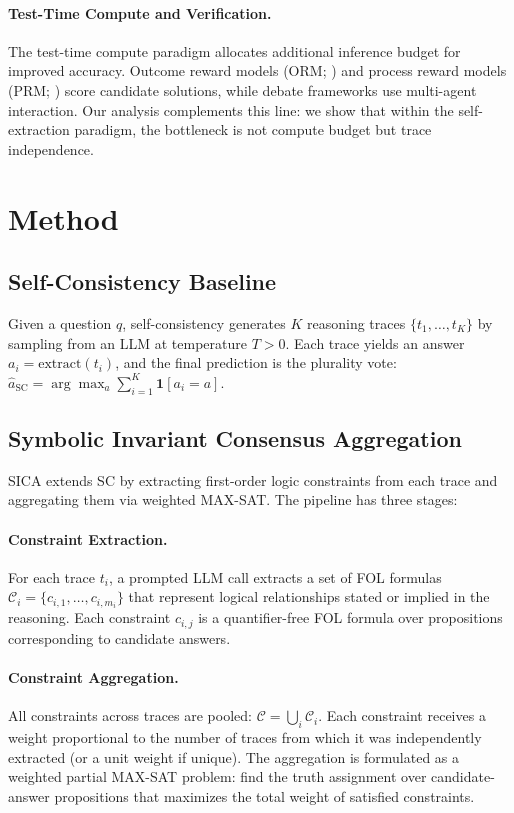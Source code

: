 \documentclass[11pt,a4paper]{article}
\begin{document}
\paragraph{Test-Time Compute and Verification.}
The test-time compute paradigm \cite{snell2025scaling} allocates additional inference budget for improved accuracy. Outcome reward models (ORM; \cite{cobbe2021gsm8k}) and process reward models (PRM; \cite{lightman2023prm}) score candidate solutions, while debate frameworks \cite{liang2023debate,du2023debate} use multi-agent interaction. Our analysis complements this line: we show that within the self-extraction paradigm, the bottleneck is not compute budget but trace independence.

\section{Method}

\subsection{Self-Consistency Baseline}

Given a question $q$, self-consistency generates $K$ reasoning traces $\{t_1, \ldots, t_K\}$ by sampling from an LLM at temperature $T > 0$. Each trace yields an answer $a_i = \text{extract}(t_i)$, and the final prediction is the plurality vote: $\hat{a}_{\text{SC}} = \arg\max_a \sum_{i=1}^{K} \mathbf{1}[a_i = a]$.

\subsection{Symbolic Invariant Consensus Aggregation}

SICA extends SC by extracting first-order logic constraints from each trace and aggregating them via weighted MAX-SAT. The pipeline has three stages:

\paragraph{Constraint Extraction.} For each trace $t_i$, a prompted LLM call extracts a set of FOL formulas $\mathcal{C}_i = \{c_{i,1}, \ldots, c_{i,m_i}\}$ that represent logical relationships stated or implied in the reasoning. Each constraint $c_{i,j}$ is a quantifier-free FOL formula over propositions corresponding to candidate answers.

\paragraph{Constraint Aggregation.} All constraints across traces are pooled: $\mathcal{C} = \bigcup_i \mathcal{C}_i$. Each constraint receives a weight proportional to the number of traces from which it was independently extracted (or a unit weight if unique). The aggregation is formulated as a weighted partial MAX-SAT problem: find the truth assignment over candidate-answer propositions that maximizes the total weight of satisfied constraints.
\end{document}
